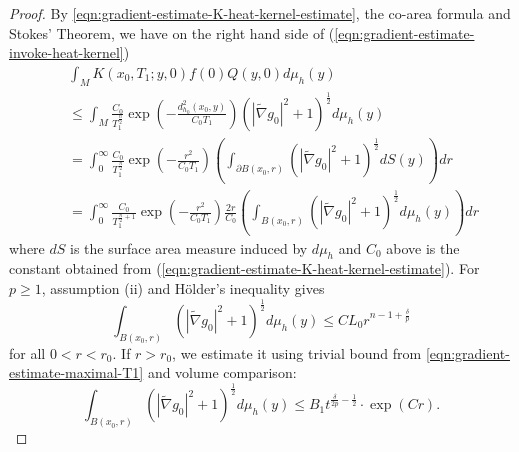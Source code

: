\documentclass[12pt]{amsart}
\theoremstyle{plain}
\theoremstyle{plain}
\theoremstyle{definition}
\theoremstyle{remark}
\numberwithin{equation}{subsection}
\newcommand{\hdel}{\tilde{\nabla}}
\begin{document}
\begin{proof}
    By \eqref{eqn:gradient-estimate-K-heat-kernel-estimate}, the co-area formula and Stokes' Theorem, we have on the right hand side of (\ref{eqn:gradient-estimate-invoke-heat-kernel})
    \begin{align}\label{eqn:gradient-estimate-Q-heat-kernel-estimate2}
        &\int_{M} K(x_0, T_1; y, 0)f(0)Q(y,0)d\mu_h(y) \nonumber \\
        \quad& \leq \int_{M} \frac{C_0}{T_1^{\frac{n}{2}}}\exp\left(-\frac{d^2_{h_0}(x_0, y)}{C_0 T_1}\right)\left(|\hdel g_0|^2 +1\right)^{\frac{1}{2}}d\mu_h(y) \nonumber \\
        &= \int_0^{\infty} \frac{C_0}{T_1^{\frac{n}{2}}}\exp\left(-\frac{r^2}{C_0 T_1}\right)\left(\int_{\partial B(x_0, r)}\left(|\hdel g_0|^2 + 1\right)^{\frac{1}{2}}dS(y)\right)dr \nonumber \\
        &= \int_0^{\infty} \frac{C_0}{T_1^{\frac{n}{2}+1}}\exp\left(-\frac{r^2}{C_0 T_1}\right)\frac{2r}{C_0}\left(\int_{B(x_0, r)}\left(|\hdel g_0|^2 + 1\right)^{\frac{1}{2}}d\mu_h(y)\right)dr
    \end{align}
    where $dS$ is the surface area measure induced by $d\mu_h$ and $C_0$ above is the constant obtained from (\ref{eqn:gradient-estimate-K-heat-kernel-estimate}). For $p \geq 1$, assumption (ii) and H\"older's inequality gives
    \begin{equation*}
        \int_{B(x_0, r)} \left(|\hdel g_0|^2 + 1\right)^{\frac{1}{2}}d\mu_h(y) \leq CL_0r^{n-1+\frac{\delta}{p}}
    \end{equation*}
    for all $0<r<r_0$. If $r>r_0$, we estimate it using trivial bound from \eqref{eqn:gradient-estimate-maximal-T1} and volume comparison:
     \begin{equation*}
        \int_{B(x_0, r)} \left(|\hdel g_0|^2 + 1\right)^{\frac{1}{2}}d\mu_h(y) \leq  B_1t^{\frac\delta{2p}-\frac12}\cdot \exp\left(Cr\right).
    \end{equation*}
    

\end{proof}
\end{document}
